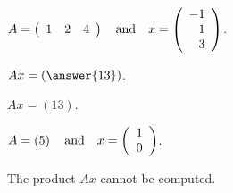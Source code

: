 \documentclass{ximera}
\begin{document}
\begin{exercise} \label{c4.1.a3c}
$A=\left(\begin{array}{rrr} 1 & 2 & 4 \end{array}\right) \quad\mbox{and}\quad
x = \left(\begin{array}{r} -1\\ 1 \\3\end{array}\right)$.
  \begin{multipleChoice}
  \end{multipleChoice}
  \begin{exercise}
    $Ax = \left(\answer{13}\right)$.

\begin{solution}
$Ax = \left(13\right)$.

\end{solution}
  \end{exercise}

\begin{solution}


\end{solution}
\end{exercise}

\begin{exercise} \label{c4.1.a3d}
  $A=\left(5\right) \quad\mbox{and}\quad x = \left(\begin{array}{r} 1 \\ 0\end{array}\right)$.
  \begin{multipleChoice}
  \end{multipleChoice}  

\begin{solution}
The product $Ax$ cannot be computed.

\end{solution}
\end{exercise}
\end{document}
